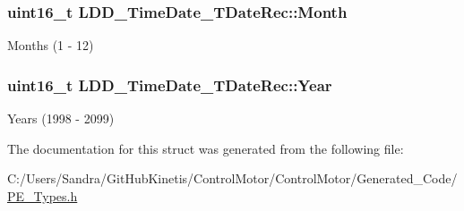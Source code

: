 \subsubsection[{\texorpdfstring{Month}{Month}}]{\setlength{\rightskip}{0pt plus 5cm}uint16\+\_\+t L\+D\+D\+\_\+\+Time\+Date\+\_\+\+T\+Date\+Rec\+::\+Month}\hypertarget{struct_l_d_d___time_date___t_date_rec_a28aaeffe98b07d60db379d12269fa822}{}\label{struct_l_d_d___time_date___t_date_rec_a28aaeffe98b07d60db379d12269fa822}
Months (1 -\/ 12) 
\subsubsection[{\texorpdfstring{Year}{Year}}]{\setlength{\rightskip}{0pt plus 5cm}uint16\+\_\+t L\+D\+D\+\_\+\+Time\+Date\+\_\+\+T\+Date\+Rec\+::\+Year}\hypertarget{struct_l_d_d___time_date___t_date_rec_a58eee644efb4f46adc3437063c7bc194}{}\label{struct_l_d_d___time_date___t_date_rec_a58eee644efb4f46adc3437063c7bc194}
Years (1998 -\/ 2099) 

The documentation for this struct was generated from the following file\+:\begin{DoxyCompactItemize}
\item 
C\+:/\+Users/\+Sandra/\+Git\+Hub\+Kinetis/\+Control\+Motor/\+Control\+Motor/\+Generated\+\_\+\+Code/\hyperlink{_p_e___types_8h}{P\+E\+\_\+\+Types.\+h}\end{DoxyCompactItemize}
